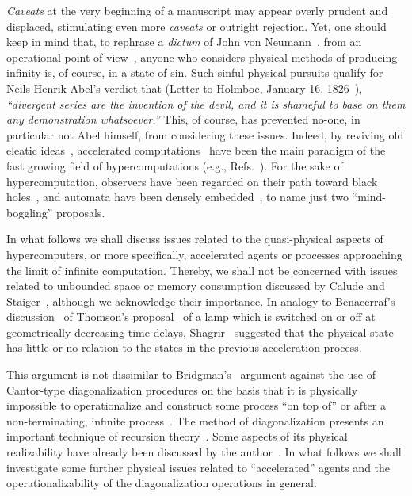 \documentclass{llncs}
\begin{document}
{\it Caveats} at the very beginning of a manuscript may appear overly prudent and displaced,
stimulating even more {\it caveats} or outright rejection.
Yet, one should keep in mind that, to rephrase a {\it dictum} of John von Neumann~\cite{von-neumann1},
from an operational point of view~\cite{bridgman},
anyone who considers physical methods of producing infinity is, of course, in a state of sin.
Such sinful physical pursuits qualify for Neils Henrik Abel's verdict that
(Letter to Holmboe, January 16, 1826~\cite{Hardy:1949,rousseau-2004}),
{\em ``divergent series are the invention of the devil, and it is shameful to base on them any demonstration whatsoever.''}
This, of course, has prevented no-one, in particular not Abel himself, from considering these issues.
Indeed, by reviving old eleatic ideas~\cite{zeno,salmon-01},
accelerated computations~\cite{weyl:49} have been the main paradigm of
the fast growing field of hypercomputations
(e.g., Refs.~\cite{Davis-2006,Doria-2006,ord-2006}).
For the sake of hypercomputation,
observers have been regarded on
their path toward black holes~\cite{Hogarth92,DBLP:conf/mcu/Durand-Lose04,Nemeti2006118},
and automata have been densely embedded~\cite{schaller-09}, to name just two ``mind-boggling'' proposals.

In what follows we shall discuss issues related to the quasi-physical aspects of hypercomputers,
or more specifically, accelerated agents or processes approaching the limit of infinite computation.
Thereby, we shall not be concerned with issues related to unbounded space or memory
consumption discussed by Calude and Staiger~\cite{calude-staiger-09},
although we acknowledge their importance.
In analogy to Benacerraf's discussion~\cite{benna:62} of Thomson's proposal~\cite{thom:54,thom:54a}
of a lamp which is switched on or off at
geometrically decreasing time delays, Shagrir~\cite{1011191} suggested that the physical state has little or no relation to
the states in the previous acceleration process.

This argument is not dissimilar to Bridgman's~\cite{bridgman} argument against the use of Cantor-type diagonalization
procedures on the basis that it is physically impossible to operationalize and construct some process ``on top of'' or after
a non-terminating, infinite process~\cite{Hamkins-02}.
The method of diagonalization presents an important technique of recursion theory~\cite{rogers1,odi:89,Boolos-07}.
Some aspects of its physical realizability have already been discussed by the author~\cite{maryland,quantum-omega,svo-1995-paradox,sv-aut-rev}.
In what follows we shall investigate some further physical issues related to ``accelerated'' agents and
the operationalizability of the diagonalization operations in general.
\end{document}
